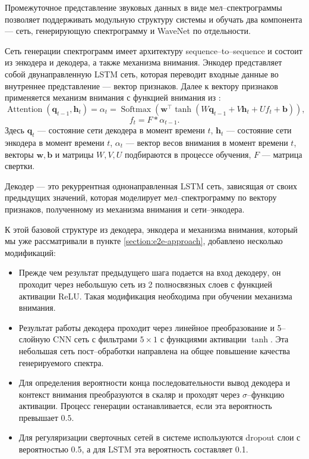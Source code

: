 Промежуточное представление звуковых данных в виде мел--спектрограммы позволяет поддерживать модульную структуру системы и обучать два компонента --- сеть, генерирующую спектрограмму и WaveNet по отдельности.

Сеть генерации спектрограмм имеет архитектуру sequence--to--sequence и состоит из энкодера и декодера, а также механизма внимания. Энкодер представляет собой двунаправленную LSTM сеть\cite{huang2015bidirectional}, которая переводит входные данные во внутреннее представление --- вектор признаков. Далее к вектору признаков применяется механизм внимания с функцией внимания из \cite{chorowski2015attention}:
$$\operatorname{Attention}(\mathbf{q}_{t - 1}, \mathbf{h}_t) = \alpha_t = \operatorname{Softmax}(\mathbf{w}^\top \tanh (W\mathbf{q}_{t - 1} + V\mathbf{h}_t + Uf_t + \mathbf{b})),$$
$$f_t = F \ast \alpha_{t - 1}.$$
Здесь $\mathbf{q}_t$ --- состояние сети декодера в момент времени $t$, $\mathbf{h}_t$ --- состояние сети энкодера в момент времени $t$, $\alpha_t$ --- вектор весов внимания в момент времени $t$, векторы $\mathbf{w}, \mathbf{b}$ и матрицы $W, V, U$ подбираются в процессе обучения, $F$ --- матрица свертки.

Декодер --- это рекуррентная однонаправленная LSTM сеть, зависящая от своих предыдущих значений, которая моделирует мел--спектрограмму по вектору признаков, полученному из механизма внимания и сети--энкодера.

К этой базовой структуре из декодера, энкодера и механизма внимания, который мы уже рассматривали в пункте \ref{section:e2e-approach}, добавлено несколько модификаций:
\begin{itemize}
	\item Прежде чем результат предыдущего шага подается на вход декодеру, он проходит через небольшую сеть из 2 полносвязных слоев с функцией активации ReLU. Такая модификация необходима при обучении механизма внимания.
	\item Результат работы декодера проходит через линейное преобразование и 5--слойную CNN сеть с фильтрами $5 \times 1$ с функциями активации $\tanh$. Эта небольшая сеть пост--обработки направлена на общее повышение качества генерируемого спектра.
	\item Для определения вероятности конца последовательности вывод декодера и контекст внимания преобразуются в скаляр и проходят через $\sigma$--функцию активации. Процесс генерации останавливается, если эта вероятность превышает $0.5$.
	\item Для регуляризации сверточных сетей в системе используются dropout слои с вероятностью 0.5, а для LSTM эта вероятность составляет 0.1.
\end{itemize}

